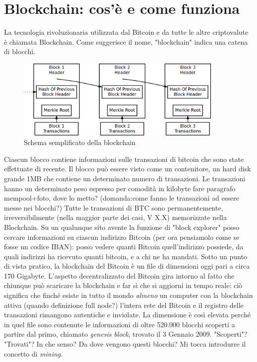 \documentclass {article}
\begin{document}
\section {Blockchain: cos'è e come funziona}


La tecnologia rivoluzionaria utilizzata dal Bitcoin e da tutte le altre criptovalute è chiamata Blockchain.
Come suggerisce il nome, "blockchain" indica una catena di blocchi.

\vspace {0.5cm}
\begin{figure}
\includegraphics [width = 10cm] {blockchain2.png}
\centering
\caption {Schema semplificato della blockchain}
\end{figure}
\vspace {0.2cm}
\noindent
%
Ciascun blocco contiene informazioni sulle transazioni di bitcoin che sono state effettuate di recente.
Il blocco può essere visto come un contenitore, un hard disk grande 1MB che contiene un determinato numero di transazioni.
Le transazioni hanno un determinato peso espresso per comodità in kilobyte fare paragrafo mempool+foto, dove lo metto? (domanda:come fanno le transazioni ad essere messe nei blocchi?)
Tutte le transazioni di BTC sono permanentemente, irreversibilmente (nella maggior parte dei casi, V X.X) memorizzate nella Blockchain.
Su un qualunque sito avente la funzione di "block explorer" posso cercare informazioni su ciascun indirizzo Bitcoin (per ora pensiamolo come se fosse un codice IBAN): posso vedere quanti Bitcoin quell'indirizzo possiede, da quali indirizzi ha ricevuto quanti bitcoin, e a chi ne ha mandati.
Sotto un punto di vista pratico, la blockchain del Bitcoin è un file di dimensioni oggi pari a circa 170 Gigabyte.
L'aspetto decentralizzato del Bitcoin gira intorno al fatto che chiunque può scaricare la blockchain e far sì che si aggiorni in tempo reale: ciò significa che finché esiste in tutto il mondo \emph{almeno} un computer con la blockchain attiva (quando definizione full node?) l'intera rete del Bitcoin e il registro delle transazioni rimangono autentiche e inviolate.
La dimensione è così elevata perché in quel file sono contenute le informazioni di oltre 520.000 blocchi scoperti a partire dal primo, chiamato \textit{genesis block}, trovato il 3 Gennaio 2009.
"Scoperti"? "Trovati"? In che senso? Da dove vengono questi blocchi? Mi tocca introdurre il concetto di \textit{mining}.
\end{document}
